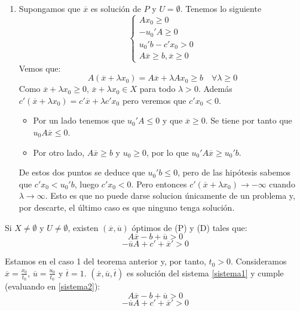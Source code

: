 \documentclass[PM.tex]{subfiles}
\begin{document}
\begin{dem}
\begin{enumerate}
\begin{enumerate}
	\item Supongamos que $\overline{x}$ es solución de $P$ y $U = \emptyset$. Tenemos lo siguiente
	\[ \begin{cases}Ax_0 \geq 0 \\ -u_0'A ≥ 0 \\ u_0'b-c'x_0 > 0 \\  A\overline{x} ≥ b,\overline{x}≥ 0\end{cases} \]
	Vemos que:
	\[ A(\overline{x} + λx_0) = A\overline{x} + λ A x_0 ≥ b \quad \forall λ\geq 0\]
	Como $\overline{x} + λ x_0 ≥ 0$, $\overline{x} + λ x_0 \in X$ para todo $λ > 0$. Además $c'(\overline{x} + λ x_0) = c'\overline{x} + λ c' x_0$ pero veremos que $c'x_0 < 0$.
	\begin{itemize}
	\item Por un lado tenemos que  $u_0'A ≤ 0$ y que $\overline{x} ≥ 0$. Se tiene por tanto que $u_0 A\overline{x} \leq 0$.
	\item Por otro lado, $A \overline{x}\geq b$ y $u_0 \geq 0$, por lo que $u_0'A\overline{x} \geq u_0'b$.
	\end{itemize}
	De estos dos puntos se deduce que $u_0'b\leq 0$, pero de las hipótesis sabemos que $c'x_0 < u_0'b$, luego $c'x_0 <0$. Pero entonces $c'(\overline{x} + λ x_0) \to -\infty$ cuando $λ \to \infty$. Esto es que no puede darse solucion únicamente de un problema y, por descarte, el último caso es que ninguno tenga solución.
	\end{enumerate}
\end{enumerate}
\end{dem}

\begin{theorem}
Si $X \neq \emptyset$ y $U \neq \emptyset$, existen $(\overline{x},\overline{u})$ óptimos de (P) y (D) tales que:
\[ A\overline{x} -b + \overline{u} > 0\]
\[ -\overline{u}A + c' +\overline{x}' > 0\]
\end{theorem}

\begin{dem}
Estamos en el caso 1 del teorema anterior y, por tanto, $t_0 > 0$. Consideramos $\overline{x} = \frac{x_0}{t_0}$, $\overline{u}=\frac{u_0}{t_0}$ y $\overline{t} = 1$. $(\overline{x},\overline{u},\overline{t})$ es solución del sistema \eqref{sistema1} y cumple (evaluando en \eqref{sistema2}):
\[ A\overline{x} -b + \overline{u} > 0\]
\[ -\overline{u}A + c' +\overline{x}' > 0\]
\end{dem}
\end{document}
